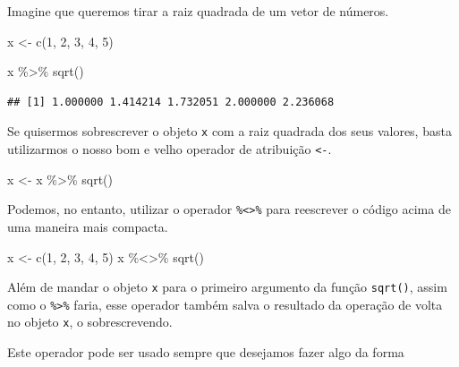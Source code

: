\documentclass[
]{book}
\newenvironment{Shaded}{\begin{snugshade}}{\end{snugshade}}
\newcommand{\DecValTok}[1]{\textcolor[rgb]{0.00,0.00,0.81}{#1}}
\newcommand{\FunctionTok}[1]{\textcolor[rgb]{0.00,0.00,0.00}{#1}}
\newcommand{\NormalTok}[1]{#1}
\newcommand{\OtherTok}[1]{\textcolor[rgb]{0.56,0.35,0.01}{#1}}
\newcommand{\SpecialCharTok}[1]{\textcolor[rgb]{0.00,0.00,0.00}{#1}}
\begin{document}
Imagine que queremos tirar a raiz quadrada de um vetor de números.

\begin{Shaded}
\begin{Highlighting}[]
\NormalTok{x }\OtherTok{\textless{}{-}} \FunctionTok{c}\NormalTok{(}\DecValTok{1}\NormalTok{, }\DecValTok{2}\NormalTok{, }\DecValTok{3}\NormalTok{, }\DecValTok{4}\NormalTok{, }\DecValTok{5}\NormalTok{)}

\NormalTok{x }\SpecialCharTok{\%\textgreater{}\%} \FunctionTok{sqrt}\NormalTok{()}
\end{Highlighting}
\end{Shaded}

\begin{verbatim}
## [1] 1.000000 1.414214 1.732051 2.000000 2.236068
\end{verbatim}

Se quisermos sobrescrever o objeto \texttt{x} com a raiz quadrada dos seus valores, basta utilizarmos o nosso bom e velho operador de atribuição \texttt{\textless{}-}.

\begin{Shaded}
\begin{Highlighting}[]
\NormalTok{x }\OtherTok{\textless{}{-}}\NormalTok{ x }\SpecialCharTok{\%\textgreater{}\%} \FunctionTok{sqrt}\NormalTok{()}
\end{Highlighting}
\end{Shaded}

Podemos, no entanto, utilizar o operador \texttt{\%\textless{}\textgreater{}\%} para reescrever o código acima de uma maneira mais compacta.

\begin{Shaded}
\begin{Highlighting}[]
\NormalTok{x }\OtherTok{\textless{}{-}} \FunctionTok{c}\NormalTok{(}\DecValTok{1}\NormalTok{, }\DecValTok{2}\NormalTok{, }\DecValTok{3}\NormalTok{, }\DecValTok{4}\NormalTok{, }\DecValTok{5}\NormalTok{)}
\NormalTok{x }\SpecialCharTok{\%\textless{}\textgreater{}\%} \FunctionTok{sqrt}\NormalTok{()}
\end{Highlighting}
\end{Shaded}

Além de mandar o objeto \texttt{x} para o primeiro argumento da função \texttt{sqrt()}, assim como o \texttt{\%\textgreater{}\%} faria, esse operador também salva o resultado da operação de volta no objeto \texttt{x}, o sobrescrevendo.

Este operador pode ser usado sempre que desejamos fazer algo da forma
\end{document}
